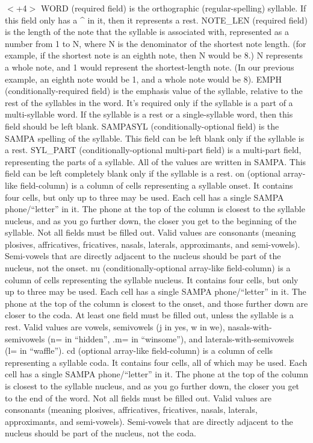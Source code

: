\documentclass[10pt,oneside]{memoir}
\def\mybibliostyle{plain}
\def\bibliocommand{}
\begin{document}
$<$+4$>$
WORD (required field) is the orthographic (regular-spelling) syllable.  If this field only has a \^{} in it, then it represents a rest.
NOTE\_LEN (required field) is the length of the note that the syllable is associated with, represented as a number from 1 to N, where N is the denominator of the shortest note length. (for example, if the shortest note is an eighth note, then N would be 8.)  N represents a whole note, and 1 would represent the shortest-length note.  (In our previous example, an eighth note would be 1, and a whole note would be 8).
EMPH (conditionally-required field) is the emphasis value of the syllable, relative to the rest of the syllables in the word. It's required only if the syllable is a part of a multi-syllable word.  If the syllable is a rest or a single-syllable word, then this field should be left blank.
SAMPASYL (conditionally-optional field) is the SAMPA spelling of the syllable. This field can be left blank only if the syllable is a rest.
SYL\_PART (conditionally-optional multi-part field) is a multi-part field, representing the parts of a syllable.  All of the values are written in SAMPA. This field can be left completely blank only if the syllable is a rest.
on (optional array-like field-column) is a column of cells representing a syllable onset.  It contains four cells, but only up to three may be used. Each cell has a single SAMPA phone/``letter'' in it.   The phone at the top of the column is closest to the syllable nucleus, and as you go further down, the closer you get to the beginning of the syllable.  Not all fields must be filled out. Valid values are consonants (meaning plosives, affricatives, fricatives, nasals, laterals, approximants, and semi-vowels).  Semi-vowels that are directly adjacent to the nucleus should be part of the nucleus, not the onset.
nu (conditionally-optional array-like field-column) is a column of cells representing the syllable nucleus. It contains four cells, but only up to three may be used. Each cell has a single SAMPA phone/``letter'' in it. The phone at the top of the column is closest to the onset, and those further down are closer to the coda.  At least one field must be filled out, unless the syllable is a rest.  Valid values are vowels, semivowels (j in yes, w in we), nasals-with-semivowels (n= in ``hidden'', .m= in ``winsome''), and laterals-with-semivowels (l= in ``waffle'').
cd (optional array-like field-column) is a column of cells representing a syllable coda.  It contains four cells, all of which may be used. Each cell has a single SAMPA phone/``letter'' in it.   The phone at the top of the column is closest to the syllable nucleus, and as you go further down, the closer you get to the end of the word.  Not all fields must be filled out. Valid values are consonants (meaning plosives, affricatives, fricatives, nasals, laterals, approximants, and semi-vowels). Semi-vowels that are directly adjacent to the nucleus should be part of the nucleus, not the coda.


%
%

\backmatter


\bibliocommand

\printglossary


\printindex
\end{document}
